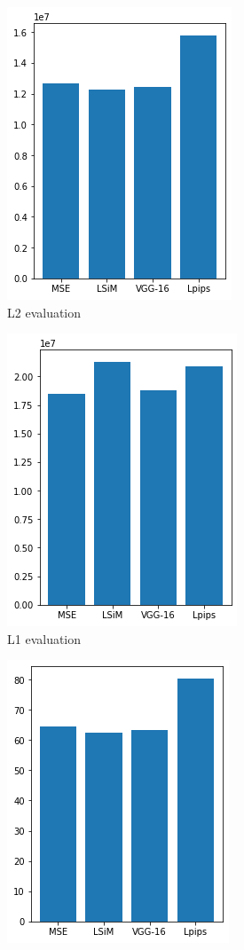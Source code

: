 \documentclass[a4paper,12pt,twoside]{report}
\begin{document}
\begin{figure}
	\centering
	\begin{subfigure}{0.32\textwidth}
		\centering
		\includegraphics[scale=0.5]{superresolution/l2.png}
		\caption{L2 evaluation}
	\end{subfigure}
	\begin{subfigure}{0.32\textwidth}
		\centering
		\includegraphics[scale=0.5]{superresolution/l1.png}
		\caption{L1 evaluation}
	\end{subfigure}
	\begin{subfigure}{0.32\textwidth}
		\centering
		\includegraphics[scale=0.5]{superresolution/mse.png}

\end{subfigure}
\end{figure}
\end{document}
